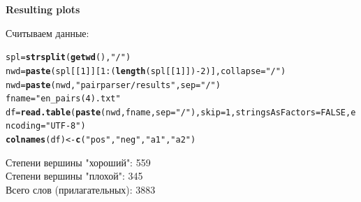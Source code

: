 \documentclass[11pt]{article}\usepackage[]{graphicx}\usepackage[]{color}
\makeatletter
\newcommand{\hlnum}[1]{\textcolor[rgb]{0.686,0.059,0.569}{#1}}%
\newcommand{\hlstr}[1]{\textcolor[rgb]{0.192,0.494,0.8}{#1}}%
\newcommand{\hlopt}[1]{\textcolor[rgb]{0,0,0}{#1}}%
\newcommand{\hlstd}[1]{\textcolor[rgb]{0.345,0.345,0.345}{#1}}%
\newcommand{\hlkwb}[1]{\textcolor[rgb]{0.69,0.353,0.396}{#1}}%
\newcommand{\hlkwc}[1]{\textcolor[rgb]{0.333,0.667,0.333}{#1}}%
\newcommand{\hlkwd}[1]{\textcolor[rgb]{0.737,0.353,0.396}{\textbf{#1}}}%
\newenvironment{kframe}{%
 \def\at@end@of@kframe{}%
 \ifinner\ifhmode%
  \def\at@end@of@kframe{\end{minipage}}%
  \begin{minipage}{\columnwidth}%
 \fi\fi%
 \def\FrameCommand##1{\hskip\@totalleftmargin \hskip-\fboxsep
 \colorbox{shadecolor}{##1}\hskip-\fboxsep
     \hskip-\linewidth \hskip-\@totalleftmargin \hskip\columnwidth}%
 \MakeFramed {\advance\hsize-\width
   \@totalleftmargin\z@ \linewidth\hsize
   \@setminipage}}%
 {\par\unskip\endMakeFramed%
 \at@end@of@kframe}
\newenvironment{knitrout}{}{} %
\makeatother
\begin{document}
\begin{center}
{\bf \Large Resulting plots\\}
\end{center}


Считываем данные:
\begin{knitrout}
\color{fgcolor}\begin{kframe}
\begin{alltt}
\hlstd{spl} \hlkwb{=} \hlkwd{strsplit}\hlstd{(}\hlkwd{getwd}\hlstd{(),} \hlstr{"/"}\hlstd{)}
\hlstd{nwd} \hlkwb{=} \hlkwd{paste}\hlstd{(spl[[}\hlnum{1}\hlstd{]][}\hlnum{1}\hlopt{:}\hlstd{(}\hlkwd{length}\hlstd{(spl[[}\hlnum{1}\hlstd{]])} \hlopt{-} \hlnum{2}\hlstd{)],} \hlkwc{collapse} \hlstd{=} \hlstr{"/"}\hlstd{)}
\hlstd{nwd} \hlkwb{=} \hlkwd{paste}\hlstd{(nwd,} \hlstr{"pairparser/results"}\hlstd{,} \hlkwc{sep} \hlstd{=} \hlstr{"/"}\hlstd{)}
\hlstd{fname} \hlkwb{=} \hlstr{"en_pairs(4).txt"}
\hlstd{df} \hlkwb{=} \hlkwd{read.table}\hlstd{(}\hlkwd{paste}\hlstd{(nwd, fname,} \hlkwc{sep} \hlstd{=} \hlstr{"/"}\hlstd{),} \hlkwc{skip} \hlstd{=} \hlnum{1}\hlstd{,} \hlkwc{stringsAsFactors} \hlstd{=} \hlnum{FALSE}\hlstd{,} \hlkwc{encoding} \hlstd{=} \hlstr{"UTF-8"}\hlstd{)}
\hlkwd{colnames}\hlstd{(df)} \hlkwb{<-} \hlkwd{c}\hlstd{(}\hlstr{"pos"}\hlstd{,} \hlstr{"neg"}\hlstd{,} \hlstr{"a1"}\hlstd{,} \hlstr{"a2"}\hlstd{)}
\end{alltt}
\end{kframe}
\end{knitrout}



Степени вершины "хороший": 559 \\
Степени вершины "плохой": 345 \\



Всего слов (прилагательных): 3883 \\
\end{document}
